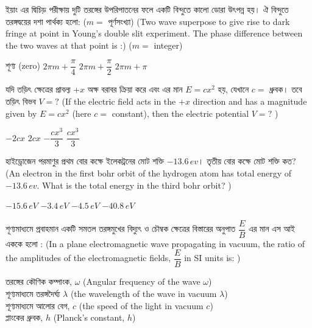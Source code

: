 \documentclass[addpoints]{exam}
\begin{document}
\begin{questions}
\begin{oneparchoices}
\end{oneparchoices}

\question  ইয়াং এর দ্বিচিড় পরীক্ষায় দুটি তরঙ্গের উপরিপাতনের ফলে একটি বিন্দুতে কালো ডোরা উৎপন্ন হয়। ঐ বিন্দুতে তরঙ্গদ্বয়ের দশা পার্থক্য হলো: ($ m= $ পূর্ণসংখ্যা) (Two wave superpose to give rise to dark fringe at point in Young's double slit experiment. The phase difference between the two waves at that point is :) ($ m= $ integer)

\begin{oneparchoices}
\choice শূণ্য (zero)
\choice $ 2\pi m +\dfrac{\pi}{4}$
\choice $ 2\pi m +\dfrac{\pi}{2}$
\choice $ 2\pi m +\pi $
\end{oneparchoices}

\question  যদি তড়িৎ ক্ষেত্রের প্রাবল্য $ +x $ অক্ষ বরাবর ক্রিয়া করে এবং এর মান $ E=cx^{2} $ হয়, যেখানে $ c= $ ধ্রুবক। তবে তড়িৎ বিভব $ V=? $ (If the electric field acts in the $ +x $ direction and has a magnitude given by $ E=cx^{2} $ (here $ c= $ constant), then the electric potential  $ V=? $ ) 

\begin{oneparchoices}
\choice $ -2cx $
\choice $ 2cx $
\choice $ -\dfrac{cx^{3}}{3} $
\choice $ \dfrac{cx^{3}}{3} $

\end{oneparchoices}

\question  হাইড্রোজেন পরমাণুর প্রথম বোর কক্ষে ইলেকট্রনের মোট শক্তি $ -13.6\,ev $। তৃতীয় বোর কক্ষে মোট শক্তি কত? (An electron in the first bohr orbit of the hydrogen atom has total energy of $ -13.6\,ev $. What is the total energy in the third bohr orbit? )

\begin{oneparchoices}
\choice $ -15.6\,eV $
\choice $ -3.4\,eV $
\choice $ -4.5\,eV $
\choice $ -40.8\,eV $
\end{oneparchoices}

\question শূণ্যমাধ্যমে প্রবাহমান একটি সমতল তরঙ্গমুখের বিদ্যুৎ ও চৌম্বক ক্ষেত্রের বিস্তারের অনুপাত $ \dfrac{E}{B} $ এর মান এস আই এককে হলো : (In a plane electromagnetic wave propagating in vacuum, the ratio of the amplitudes of the electromagnetic fields, $ \dfrac{E}{B} $ in SI units is: )

\begin{oneparchoices}
\hspace*{.2cm}\choice তরঙ্গের কৌণিক কম্পাংক, $ \omega $ (Angular frequency of the wave $ \omega $)\\
\choice শূণ্যমাধ্যমে তরঙ্গদৈর্ঘ্য $ \lambda $ (the wavelength of the wave in vacuum $ \lambda $)\\
\choice  শূণ্যমাধ্যমে আলোর বেগ, $ c $ (the speed of the light in vacuum $ c $)\\
\choice  প্লাংকের ধ্রুবক, $ h $ (Planck's constant, $ h $)
\end{oneparchoices}


\end{questions}
\end{document}

